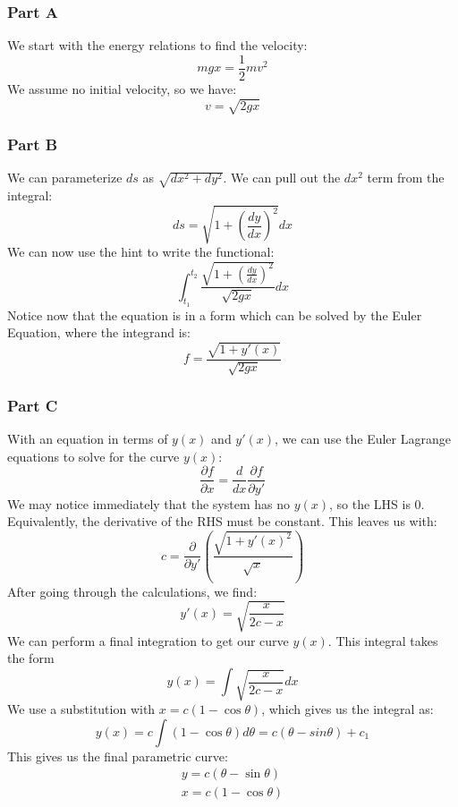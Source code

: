 \documentclass[10pt, openany, titlepage]{book}
\theoremstyle{definition}
\begin{document}
\subsubsection{Part A}
We start with the energy relations to find the velocity:
$$mgx=\frac{1}{2}mv^2$$
We assume no initial velocity, so we have:
$$v=\sqrt{2gx}$$
\subsubsection{Part B}
We can parameterize $ds$ as $\sqrt{dx^2+dy^2}$. We can pull out the $dx^2$ term from the integral:
$$ds=\sqrt{1+\left(\frac{dy}{dx}\right)^2}dx$$
We can now use the hint to write the functional:
$$\int_{t_1}^{t_2}\frac{\sqrt{1+\left(\frac{dy}{dx}\right)^2}}{\sqrt{2gx}}dx$$
Notice now that the equation is in a form which can be solved by the \gls{Euler Equation}, where the integrand is:
$$f=\frac{\sqrt{1+y'(x)}}{\sqrt{2gx}}$$
\subsubsection{Part C}
With an equation in terms of $y(x)$ and $y'(x)$, we can use the Euler Lagrange equations to solve for the curve $y(x)$:
    $$\frac{\partial f}{\partial x}=\frac{d}{dx}\frac{\partial f}{\partial y'}$$
    We may notice immediately that the system has no $y(x)$, so the LHS is 0. Equivalently, the derivative of the RHS must be constant. This leaves us with:$$c=\frac{\partial}{\partial y'}\left(\frac{\sqrt{1+y'(x)^2}}{\sqrt{x}}\right)$$
    After going through the calculations, we find:$$y'(x)=\sqrt{\frac{x}{2c-x}}$$
    We can perform a final integration to get our curve $y(x)$. This integral takes the form $$y(x)=\int\sqrt{\frac{x}{2c-x}}dx$$
We use a substitution with $x=c(1-\cos\theta)$, which gives us the integral as:
    $$y(x)=c\int(1-\cos\theta)d\theta=c(\theta-sin\theta)+c_1$$ This gives us the final parametric curve:
    \begin{gather}
        y=c(\theta-\sin\theta)\\
        x=c(1-\cos\theta)
    \end{gather}
\end{document}
